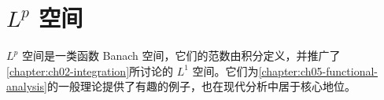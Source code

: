 \documentclass[../main.tex]{subfiles}
\begin{document}
\chapter{$L^p$ 空间}\label{chapter:ch06-lp-spaces}
$L^p$ 空间是一类函数 Banach 空间，它们的范数由积分定义，并推广了\cref{chapter:ch02-integration}所讨论的 $L^1$ 空间。它们为\cref{chapter:ch05-functional-analysis}的一般理论提供了有趣的例子，也在现代分析中居于核心地位。






\end{document}
